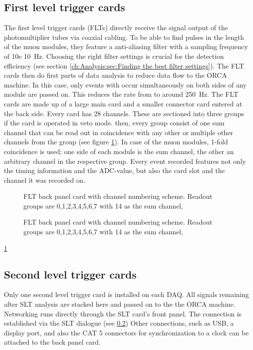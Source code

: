   \subsection{First level trigger cards}
  \label{ch:The muon detection system: sec: DAQ:subsec:FLTs}
  The first level trigger cards (FLTs) directly receive the signal output of the photomultiplier tubes via coaxial cabling. To be able to find pulses in the length of the muon modules, they feature a anti-aliasing filter with a sampling frequency of \SI{10e 10}{\hertz}. Choosing the right filter settings is crucial for the detection efficiency (see section \ref{ch:Analysis:sec:Finding the best filter settings}). The FLT cards then do first parts of data analysis to reduce data flow to the ORCA machine. In this case, only events with occur simultaneously on both sides of any module are passed on. This reduces the rate from  to around \SI{250}{\hertz}. The FLT cards are made up of a large main card and a smaller connector card entered at the back side. Every card has 28 channels. These are sectioned into three groups if the card is operated in veto mode. then, every group consist of one sum channel that can be read out in coincidence with any other or multiple other channels from the group (see figure \ref{fig:DAQ:FLTFront}). In case of the muon modules, 1-fold coincidence is used; one side of each module is the sum channel, the other an arbitrary channel in the respective group. Every event recorded features not only the timing information and the ADC-value, but also the card slot and the channel it was recorded on.
  
  \begin{figure}
	  \caption[FLT back panel card]{FLT back panel card with channel numbering scheme. Readout groups are 0,1,2,3,4,5,6,7 with 14 as the sum channel,}
	  \label{fig:DAQ:FLTFront}
  \end{figure}
  \begin{figure}
	  \caption[FLT back panel card]{FLT back panel card with channel numbering scheme. Readout groups are 0,1,2,3,4,5,6,7 with 14 as the sum channel,}
	  \label{fig:DAQ:FLTBack}
  \end{figure}
  \ref{fig:DAQ:FLTFront}
  \subsection{Second level trigger cards}
  \label{ch:The muon detection system: sec: DAQ:subsec:SLTs}
  Only one second level trigger card is installed on each DAQ. All signals remaining after SLT analysis are stacked here and passed on to the the ORCA machine. Networking runs directly through the SLT card's front panel. The connection is established via the SLT dialogue (see \ref{ch:The muon detection system: sec: DAQ:subsec:SLTs}) Other connections, such as USB, a display port, and also the CAT 5 connectors for synchronization to a clock can be attached to the back panel card. 

